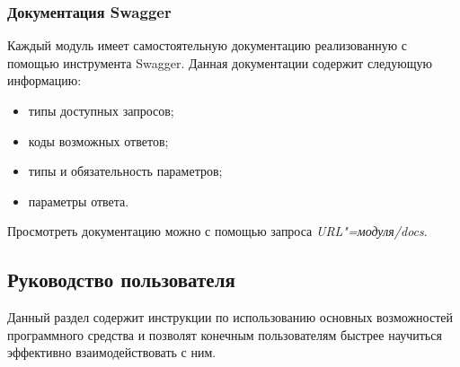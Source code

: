 \subsubsection{Документация Swagger}
Каждый модуль имеет самостоятельную документацию реализованную с помощью инструмента Swagger.
Данная документации содержит следующую информацию:
\begin{itemize}
    \item типы доступных запросов;
    \item коды возможных ответов;
    \item типы и обязательность параметров;
    \item параметры ответа.
\end{itemize}

Просмотреть документацию можно с помощью запроса \emph{URL"=модуля/docs}.

\subsection{Руководство пользователя}
\label{sec:manpage:client_man}
Данный раздел содержит инструкции по использованию основных возможностей программного средства и позволят конечным пользователям быстрее научиться эффективно взаимодействовать с ним.

